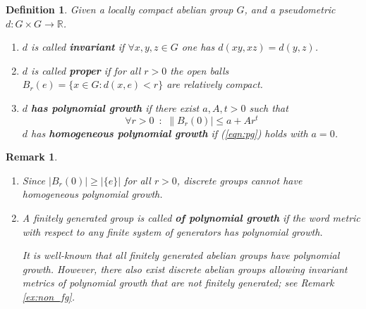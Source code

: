 \documentclass[12pt, reqno]{amsart}
\newtheorem{definition}[theorem]{Definition}
\newtheorem{remark}[theorem]{Remark}
\begin{document}
\begin{definition} \label{defn:main}
Given a locally compact abelian group $G$, and a pseudometric $d: G \times G \to \mathbb{R}$.
\begin{enumerate}
    \item[(i)] $d$ is called \textbf{invariant} if $\forall x,y,z \in G$ one has $d(xy,xz) = d(y,z)$.
    \item[(ii)] $d$ is called \textbf{proper} if for all $r>0$ the open balls $B_r(e) = \{ x \in G : d(x,e) < r \}$ are relatively compact. 
    \item[(iii)] $d$  \textbf{has polynomial growth} if there exist $a,A,t>0$ such that
 \begin{equation}  \label{eqn:pg} \forall r>0\,\,\,:\,\,\|B_r(0)| \le a + A r^t \end{equation}
   $d$ has \textbf{homogeneous polynomial growth} if (\ref{eqn:pg}) holds with $a=0$.
\end{enumerate}
\end{definition}

\begin{remark}
\begin{enumerate}
\item[(a)] Since $|B_r(0)| \ge |\{ e \}|$ for all $r>0$, discrete groups cannot have homogeneous polynomial growth.
\item[(b)] A finitely generated group is called \textbf{of polynomial growth} if the word metric with respect to any finite system of generators has polynomial growth. 

It is well-known that all finitely generated abelian groups have polynomial growth. However, there also exist discrete abelian groups allowing invariant metrics of polynomial growth that are not finitely generated; see Remark \ref{ex:non_fg}.
\end{enumerate}
\end{remark}

\end{document}
